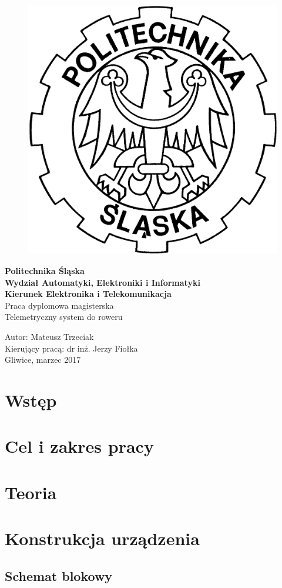 \documentclass[12pt,a4paper]{report}
\begin{document}
\hspace{2cm}
\begin{figure}[!h]
\centering
\includegraphics[width=2.5 cm, height=2.5 cm]{Obrazy/godlo_polibudy} 
\end{figure}

\begin{center}
{\Large\textbf{Politechnika Śląska\\
Wydział Automatyki, Elektroniki i Informatyki
\\[0.3cm]Kierunek Elektronika i Telekomunikacja}}
\\[3.5cm]
{\Large Praca dyplomowa magisterska}
\\[3cm] 
{\large Telemetryczny system do roweru\\[4.5cm] }
\end{center}
\begin{flushleft}
{\large Autor: Mateusz Trzeciak\\
Kierujący pracą: dr inż. Jerzy Fiołka
\\[3cm]Gliwice, marzec 2017}
\end{flushleft}
\tableofcontents	%

\chapter{Wstęp} \label{rozdz.wstep} 


\chapter{Cel i zakres pracy} \label{etykietarozdzialu2}


\chapter{Teoria}


\chapter{Konstrukcja urządzenia}
\section{Schemat blokowy}
\end{document}
